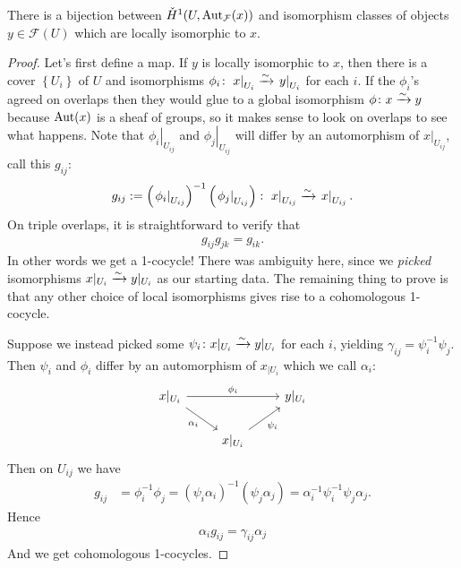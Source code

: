 \documentclass[11pt,openany]{book}
\begin{document}
\begin{theorem}\label{thm:cech-cohom-measures-an-LGP} 
There is a bijection between $\check{H}^1(U,\mathrm{Aut}_{\mathcal{F}}(x))$ and isomorphism classes of objects $y\in \mathscr{F}(U)$ which are locally isomorphic to $x$.
\end{theorem}
\begin{proof} Let's first define a map. If $y$ is locally isomorphic to $x$, then there is a cover $\left\{ U_i \right\}$ of $U$ and isomorphisms $\phi_i \colon \left. x \right|_{ U_i } \xrightarrow{\sim} \left. y \right|_{ U_i }$ for each $i$. If the $\phi_i$'s agreed on overlaps then they would glue to a global isomorphism $\phi \colon x \xrightarrow{\sim} y$ because $\mathrm{Aut}(x)$ is a sheaf of groups, so it makes sense to look on overlaps to see what happens. Note that $\left. \phi_i \right|_{ U_{ij} }$ and $\left. \phi_j \right|_{ U_{ij} }$ will differ by an automorphism of $\left. x \right|_{ U_{ij} }$, call this $g_{ij}$:
\begin{align*}
    g_{ij} := \left( \left. \phi_i \right|_{ U_{ij} } \right)^{-1} \left( \left. \phi_j \right|_{ U_{ij} } \right) \colon \left. x \right|_{ U_{ij}  }\xrightarrow{\sim} \left. x \right|_{ U_{ij} }.
\end{align*}
On triple overlaps, it is straightforward to verify that
\begin{align*}
    g_{ij}g_{jk} = g_{ik}.
\end{align*}
In other words we get a 1-cocycle! There was ambiguity here, since we \textit{picked} isomorphisms $x|_{U_i} \xrightarrow{\sim} y|_{U_i}$ as our starting data. The remaining thing to prove is that any other choice of local isomorphisms gives rise to a cohomologous 1-cocycle.

Suppose we instead picked some $\psi_i \colon x|_{U_i} \xrightarrow{\sim} y|_{U_i}$ for each $i$, yielding $\gamma_{ij} = \psi_i^{-1}\psi_j$. Then $\psi_i$ and $\phi_i$ differ by an automorphism of $x_{|U_i}$ which we call $\alpha_i$:
\[ \begin{tikzcd}
    x|_{U_i}\ar[rr,"\phi_i"]\ar[dr,"\alpha_i" below left] &  & y|_{U_i}\\
     & x|_{U_i}\ar[ur,"\psi_i" below right] & 
\end{tikzcd} \]
%
Then on $U_{ij}$ we have
\begin{align*}
    g_{ij} &= \phi_i^{-1} \phi_j = \left( \psi_i \alpha_i \right)^{-1} \left( \psi_j \alpha_j \right) = \alpha_i^{-1} \psi_i^{-1}\psi_j \alpha_j.
\end{align*}
Hence
\begin{align*}
    \alpha_i g_{ij} = \gamma_{ij}\alpha_j
\end{align*}
And we get cohomologous 1-cocycles.
\end{proof}
\end{document}

